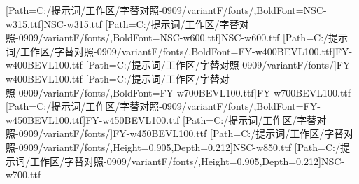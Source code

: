 [Path=C:/提示词/工作区/字替对照-0909/variantF/fonts/,BoldFont=NSC-w315.ttf]{NSC-w315.ttf}
[Path=C:/提示词/工作区/字替对照-0909/variantF/fonts/,BoldFont=NSC-w600.ttf]{NSC-w600.ttf}
[Path=C:/提示词/工作区/字替对照-0909/variantF/fonts/,BoldFont=FY-w400BEVL100.ttf]{FY-w400BEVL100.ttf}
\newfontfamily{\libianlat}[Path=C:/提示词/工作区/字替对照-0909/variantF/fonts/]{FY-w400BEVL100.ttf}
[Path=C:/提示词/工作区/字替对照-0909/variantF/fonts/,BoldFont=FY-w700BEVL100.ttf]{FY-w700BEVL100.ttf}
[Path=C:/提示词/工作区/字替对照-0909/variantF/fonts/,BoldFont=FY-w450BEVL100.ttf]{FY-w450BEVL100.ttf}
\newfontfamily{\libianslat}[Path=C:/提示词/工作区/字替对照-0909/variantF/fonts/]{FY-w450BEVL100.ttf}
\newfontfamily{\numbold}[Path=C:/提示词/工作区/字替对照-0909/variantF/fonts/,Height=0.905,Depth=0.212]{NSC-w850.ttf}
\newfontfamily{\numboldjian}[Path=C:/提示词/工作区/字替对照-0909/variantF/fonts/,Height=0.905,Depth=0.212]{NSC-w700.ttf}
